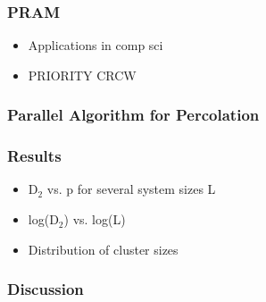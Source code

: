 \documentclass[11pt]{article}
\begin{document}
\subsubsection{PRAM}
\label{sec-1_4_3}
\begin{itemize}

\item Applications in comp sci\\
\label{sec-1_4_3_1}%
\item PRIORITY CRCW\\
\label{sec-1_4_3_2}%
\end{itemize} %
\subsubsection{Parallel Algorithm for Percolation}
\label{sec-1_4_4}
\subsubsection{Results}
\label{sec-1_4_5}
\begin{itemize}

\item D$_2$ vs. p for several system sizes L\\
\label{sec-1_4_5_1}%
\item log(D$_2$) vs. log(L)\\
\label{sec-1_4_5_2}%
\item Distribution of cluster sizes\\
\label{sec-1_4_5_3}%
\end{itemize} %
\subsubsection{Discussion}
\label{sec-1_4_6}
\end{document}

